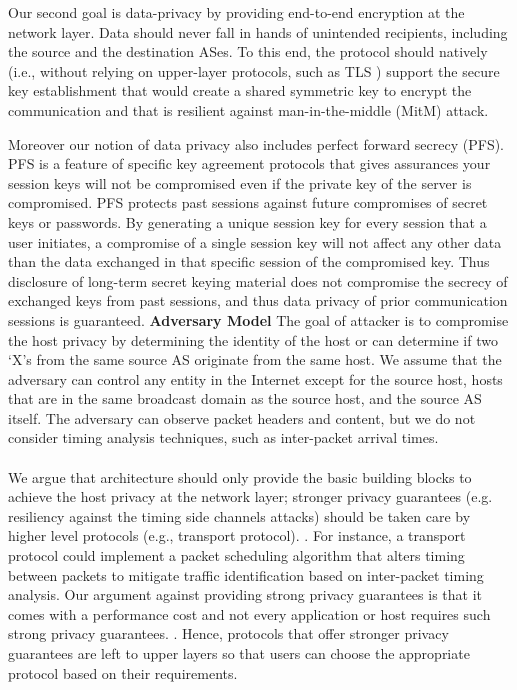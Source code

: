 Our second goal is data-privacy by providing end-to-end encryption at the network layer. Data should never fall in hands of unintended recipients, including the source and the destination ASes. To this end, the protocol should natively (i.e., without relying on upper-layer protocols, such as TLS \cite{tls}) support the secure key establishment that would create a shared symmetric key to encrypt the communication and that is resilient against man-in-the-middle (MitM) attack.

Moreover our notion of data privacy also includes perfect forward secrecy (PFS). PFS is a feature of specific key agreement protocols that gives assurances your session keys will not be compromised even if the private key of the server is compromised. PFS protects past sessions against future compromises of secret keys or passwords. By generating a unique session key for every session that a user initiates, a compromise of a single session key will not affect any other data than the data exchanged in that specific session of the compromised key. Thus disclosure of long-term secret keying material does not compromise the secrecy of exchanged keys from past sessions, and thus data privacy of prior communication sessions is guaranteed.
\newline \newline
\textbf{Adversary Model} \newline \newline
The goal of attacker is to compromise the host privacy by determining the identity of the host or can determine if two ‘X’s from the same source AS originate from the same host. We assume that the adversary can  control any entity in the Internet except for the source host, hosts that are in the same broadcast domain as the source host, and the source AS itself. The adversary can observe packet headers and content, but we do not consider timing analysis techniques, such as inter-packet arrival times.
\\ \\
We argue that architecture should only provide the basic building blocks to achieve the host privacy at the network layer; stronger privacy guarantees (e.g. resiliency against the timing side channels attacks) should be taken care by higher level protocols (e.g., transport protocol). . For instance, a transport protocol could implement a packet scheduling algorithm that alters timing between packets to mitigate traffic identification based on inter-packet timing analysis. Our argument against providing strong privacy guarantees is that it comes with a performance cost and not every application or host requires such strong privacy guarantees. . Hence, protocols that offer stronger privacy guarantees are left to upper layers so that users can choose the appropriate protocol based on their requirements.

